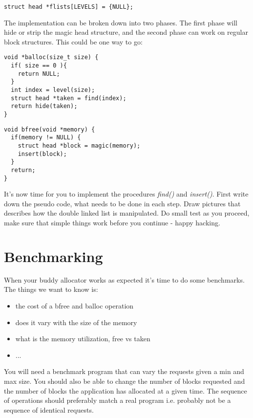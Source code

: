 \documentclass[a4paper,11pt]{article}
\begin{document}
\begin{lstlisting}
struct head *flists[LEVELS] = {NULL};
\end{lstlisting}

The implementation can be broken down into two phases. The first phase
will hide or strip the magic head structure, and the second phase
can work on regular block structures. This could be one way to
go:

\begin{lstlisting}
void *balloc(size_t size) {
  if( size == 0 ){
    return NULL;
  }
  int index = level(size);
  struct head *taken = find(index);
  return hide(taken);
}
\end{lstlisting}


\begin{lstlisting}
void bfree(void *memory) {
  if(memory != NULL) {
    struct head *block = magic(memory);
    insert(block);
  }
  return;
}
\end{lstlisting}

It's now time for you to implement the procedures {\em find()} and {\em
  insert()}. First write down the pseudo code, what needs to be done
in each step. Draw pictures that describes how the double linked list
is manipulated. Do small test as you proceed, make sure that simple
things work before you continue - happy hacking.

\section{Benchmarking}

When your buddy allocator works as expected it's time to do some
benchmarks. The things we want to know is:

\begin{itemize}
\item the cost of a bfree and balloc operation
\item does it vary with the size of the memory
\item what is the memory utilization, free vs taken
\item ...
\end{itemize}

You will need a benchmark program that can vary the requests given a
min and max size. You should also be able to change the number of
blocks requested and the number of blocks the application has
allocated at a given time. The sequence of operations should
preferably match a real program i.e. probably not be a sequence of
identical requests.
\end{document}
